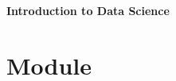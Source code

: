 \documentclass[./main.tex]{subfiles}
\begin{document}
{\LARGE\bf Introduction to Data Science}

\vspace{12pt}

\section{Module}
\end{document}
